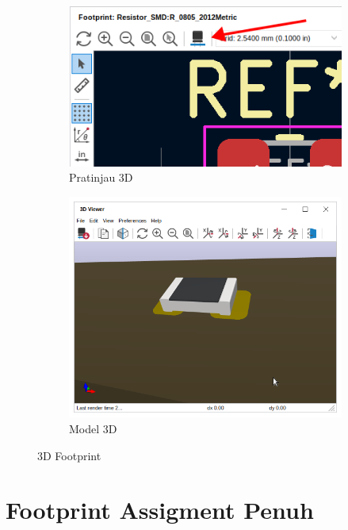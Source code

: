 \documentclass[12pt]{book}
\begin{document}
	\newpage
	\begin{figure}[!ht]
		\centering
		\begin{subfigure}[t]{0.45\textwidth}
			\includegraphics[width=\textwidth]{images/fpa/fpa_7}
			\caption{Pratinjau 3D}
		\end{subfigure}
		\begin{subfigure}[t]{0.45\textwidth}
			\includegraphics[width=\textwidth]{images/fpa/fpa_8}
			\caption{Model 3D}
		\end{subfigure}
		\caption{3D Footprint}
	\end{figure}

	\newpage
	\section{Footprint Assigment Penuh}
\end{document}
